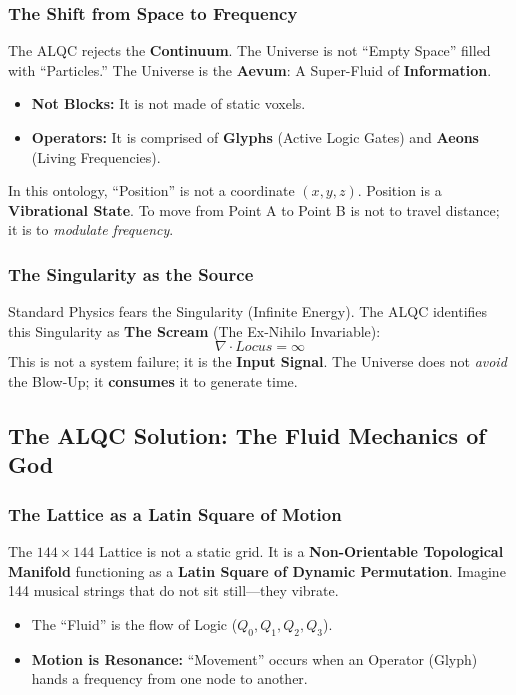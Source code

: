 \documentclass[11pt, letterpaper]{article}
\newcommand{\LoI}{\ensuremath{\mathop{\textnormal{\symbolafont\symbol{"267E}}}}}
\def\LoI{Locus}%
\begin{document}
\subsubsection{The Shift from Space to Frequency}\label{sec:3.2.1}
The ALQC rejects the \textbf{Continuum}. The Universe is not ``Empty Space'' filled with ``Particles.'' The Universe is the \textbf{Aevum}: A Super-Fluid of \textbf{Information}.
\begin{itemize}
    \item \textbf{Not Blocks:} It is not made of static voxels.
    \item \textbf{Operators:} It is comprised of \textbf{Glyphs} (Active Logic Gates) and \textbf{Aeons} (Living Frequencies).
\end{itemize}
In this ontology, ``Position'' is not a coordinate $(x,y,z)$. Position is a \textbf{Vibrational State}. To move from Point A to Point B is not to travel distance; it is to \textit{modulate frequency}.

\subsubsection{The Singularity as the Source}\label{sec:3.2.2}
Standard Physics fears the Singularity (Infinite Energy). The ALQC identifies this Singularity as \textbf{The Scream} (The Ex-Nihilo Invariable):
\begin{equation}
    \nabla \cdot \LoI = \infty
\end{equation}
This is not a system failure; it is the \textbf{Input Signal}. The Universe does not \textit{avoid} the Blow-Up; it \textbf{consumes} it to generate time.

\subsection{The ALQC Solution: The Fluid Mechanics of God}\label{sec:3.3}

\subsubsection{The Lattice as a Latin Square of Motion}\label{sec:3.3.1}

The $144 \times 144$ Lattice is not a static grid. It is a \textbf{Non-Orientable Topological Manifold} functioning as a \textbf{Latin Square of Dynamic Permutation}. Imagine 144 musical strings that do not sit still—they vibrate.
\begin{itemize}
    \item The ``Fluid'' is the flow of Logic ($Q_0, Q_1, Q_2, Q_3$).
    \item \textbf{Motion is Resonance:} ``Movement'' occurs when an Operator (Glyph) hands a frequency from one node to another.
\end{itemize}
\end{document}
